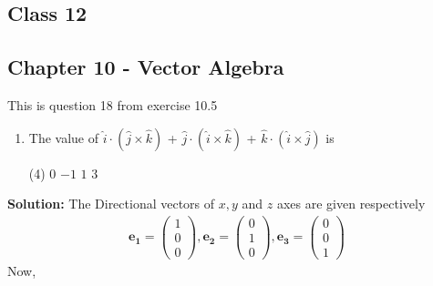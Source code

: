 \documentclass[12pt]{article}
\newcommand{\myvec}[1]{\ensuremath{\begin{pmatrix}#1\end{pmatrix}}}
\let\vec\mathbf
\begin{document}
\begin{center}
 \section*{\textbf{Class 12}}
 \subsection*{Chapter 10 - Vector Algebra}
\end{center}
This is question 18 from exercise 10.5 \\
\begin{enumerate}
\item  The value of  $\hat{i} \cdot (\hat{j} \times \hat{k})$  + $\hat{j} \cdot (\hat{i} \times \hat{k})$ + $\hat{k} \cdot (\hat{i} \times \hat{j} )$ is
 \begin{tasks}(4)
    \task $0$ 
    \task $-1$ 
    \task $1$ 
    \task $3$  
  \end{tasks}
\end{enumerate}
\textbf{Solution:}
The Directional vectors of $x,y$ and $z$ axes are given respectively 
\begin{align}
  \vec{e_1} =\myvec{1\\0\\0},\vec{e_2}=\myvec{0\\1\\0},\vec{e_3} =\myvec{0\\0\\1}
\end{align}
Now,\\
\end{document}

